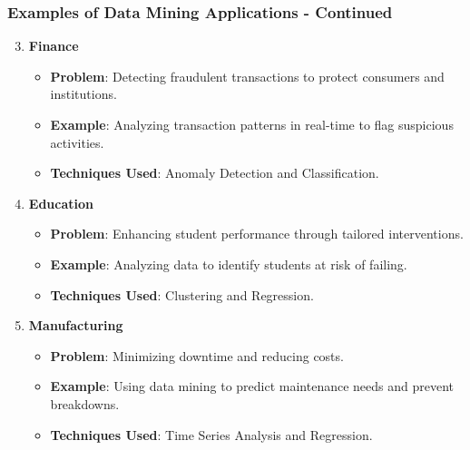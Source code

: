 \documentclass{beamer}
\begin{document}
\begin{frame}[fragile]
    \frametitle{Examples of Data Mining Applications - Continued}
    \begin{enumerate}
        \setcounter{enumi}{2} %
        \item \textbf{Finance} 
        \begin{itemize}
            \item \textbf{Problem}: Detecting fraudulent transactions to protect consumers and institutions.
            \item \textbf{Example}: Analyzing transaction patterns in real-time to flag suspicious activities.
            \item \textbf{Techniques Used}: Anomaly Detection and Classification.
        \end{itemize}

        \item \textbf{Education} 
        \begin{itemize}
            \item \textbf{Problem}: Enhancing student performance through tailored interventions.
            \item \textbf{Example}: Analyzing data to identify students at risk of failing.
            \item \textbf{Techniques Used}: Clustering and Regression.
        \end{itemize}
        
        \item \textbf{Manufacturing} 
        \begin{itemize}
            \item \textbf{Problem}: Minimizing downtime and reducing costs.
            \item \textbf{Example}: Using data mining to predict maintenance needs and prevent breakdowns.
            \item \textbf{Techniques Used}: Time Series Analysis and Regression.
        \end{itemize}
    \end{enumerate}
\end{frame}
\end{document}
